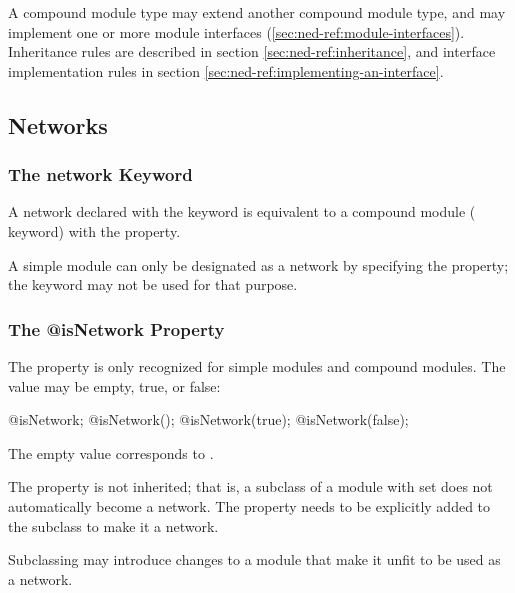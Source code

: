 A compound module type may extend another compound module type, and
may implement one or more module interfaces (\ref{sec:ned-ref:module-interfaces}).
Inheritance rules are described in section \ref{sec:ned-ref:inheritance},
and interface implementation rules in section \ref{sec:ned-ref:implementing-an-interface}.



\subsection{Networks}
\label{sec:ned-ref:networks}

\subsubsection{The network Keyword}
\label{sec:ned-ref:network-keyword}

A network declared with the  keyword is equivalent to a compound
module ( keyword) with the  property.

\begin{note}
    A simple module can only be designated as a network by specifying the
     property; the  keyword may not
    be used for that purpose.
\end{note}

\subsubsection{The @isNetwork Property}
\label{sec:ned-ref:isnetwork-property}

The  property is only recognized for simple modules and
compound modules. The value may be empty, true, or false:

\begin{ned}
@isNetwork;
@isNetwork();
@isNetwork(true);
@isNetwork(false);
\end{ned}

The empty value corresponds to .

The  property is not inherited; that is, a subclass
of a module with  set does not automatically become a network.
The  property needs to be explicitly added to the subclass
to make it a network.

\begin{rationale}
    Subclassing may introduce changes to a module that make it unfit to be used
    as a network.
\end{rationale}



